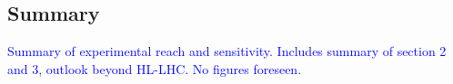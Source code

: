 \subsection{Summary}
\textcolor{blue}{Summary of experimental reach and sensitivity. Includes summary of section 2 and 3, outlook beyond HL-LHC. No figures foreseen.} 